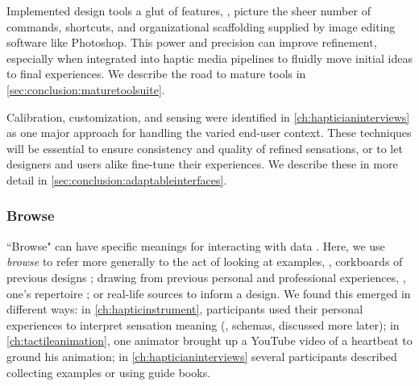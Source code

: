Implemented design tools a glut of features, \eg, picture the sheer number of commands, shortcuts, and organizational scaffolding supplied by image editing software like Photoshop.
This power and precision can improve refinement, especially when integrated into haptic media pipelines to fluidly move initial ideas to final experiences. 
We describe the road to mature tools in \autoref{sec:conclusion:maturetoolsuite}.



Calibration, customization, and sensing were identified in \autoref{ch:hapticianinterviews} as one major approach for handling the varied end-user context. 
These techniques will be essential to ensure consistency and quality of refined sensations, or to let designers and users alike fine-tune their experiences.
We describe these in more detail in \autoref{sec:conclusion:adaptableinterfaces}.


%
%
\subsubsection{Browse} 
``Browse" can have specific meanings for interacting with data \cite{munzner2014visualization}.
Here, we use \emph{browse} to refer more generally to the act of looking at examples, \eg, corkboards of previous designs \cite{Buxton2007}; drawing from previous personal and professional experiences, \eg, one's repertoire \cite{Schon1982}; or real-life sources to inform a design.
We found this emerged in different ways:
in \autoref{ch:hapticinstrument}, participants used their personal experiences to interpret sensation meaning (\ie, schemas, discussed more later);
in \autoref{ch:tactileanimation}, one animator brought up a YouTube video of a heartbeat to ground his animation;
in \autoref{ch:hapticianinterviews} several participants described collecting examples or using guide books.

